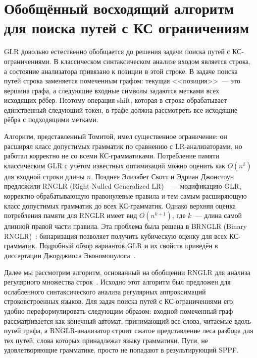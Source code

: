\section{Обобщённый восходящий алгоритм для поиска путей с КС ограничениям}
\label{sec:CFPQ_GLR}

GLR довольно естественно обобщается до решения задачи поиска путей с КС-ограничениями.
В классическом синтаксическом анализе входом является строка, а состояние анализатора привязано к позиции в этой строке.
В задаче поиска путей строка заменяется помеченным графом: текущая <<позиция>>~--- это вершина графа, а следующие входные символы задаются метками всех исходящих рёбер.
Поэтому операция shift, которая в строке обрабатывает единственный следующий токен, в графе должна рассмотреть все исходящие рёбра с подходящими метками.

Алгоритм, представленный Томитой, имел существенное ограничение: он расширял класс допустимых грамматик по сравнению с LR-анализаторами, но работал корректно не со всеми КС-грамматиками.
Потребление памяти классическим GLR с учётом известных оптимизаций можно оценить как $O(n^3)$ для входной строки длины $n$.
Позднее Элизабет Скотт и Эдриан Джонстоун предложили RNGLR (Right-Nulled Generalized LR)~~--- модификацию GLR, корректно обрабатывающую правонулевые правила и тем самым расширяющую класс допустимых грамматик до всех КС-грамматик.
Однако верхняя оценка потребления памяти для RNGLR имеет вид $O(n^{k+1})$, где $k$~--- длина самой длинной правой части правила.
Эта проблема была решена в BRNGLR (Binary RNGLR)~: бинаризация позволяет получить кубическую оценку для всех КС-грамматик.
Подробный обзор вариантов GLR и их свойств приведён в диссертации Джорджиоса Экономопулоса~.

Далее мы рассмотрим алгоритм, основанный на обобщении RNGLR для анализа регулярного множества строк~.
Исходно этот алгоритм был предложен для ослабленного синтаксического анализа регулярных аппроксимаций строковстроенных языков.
Для задач поиска путей с КС-ограничениями его удобно переформулировать следующим образом: входной помеченный граф рассматривается как конечный автомат, принимающий все слова, читаемые вдоль путей графа, а RNGLR-анализатор строит сжатое представление леса разбора для тех путей, слова которых принадлежат языку грамматики.
Пути, не удовлетворяющие грамматике, просто не попадают в результирующий SPPF.

